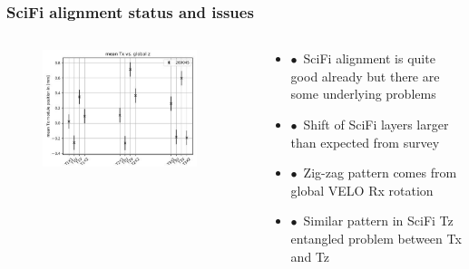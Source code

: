 \documentclass[aspectratio=1610, 12pt, xcolor=dvipsnames]{beamer}
\begin{document}
\begin{frame}\frametitle{SciFi alignment status and issues}
  \begin{columns}
    \begin{column}[c]{0.6\textwidth}
      \begin{figure}
        \centering
        \includegraphics[width=0.9\textwidth]{plots/outfiles_vs_global/Layers_Tx_pattern.png}
      \end{figure}
    \end{column}
    \begin{column}[c]{0.4\textwidth}
      \begin{itemize}
        \item $\bullet$\, SciFi alignment is quite good already but there are some underlying problems
        \item $\bullet$\, Shift of SciFi layers larger than expected from survey
        \item $\bullet$\, Zig-zag pattern comes from global VELO Rx rotation
        \item $\bullet$\, Similar pattern in SciFi Tz \to entangled problem between Tx and Tz
      \end{itemize}
    \end{column}
  \end{columns}
\end{frame}
\end{document}
